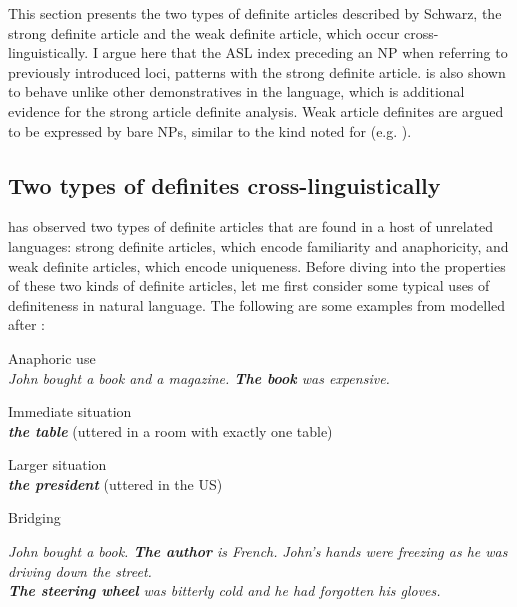 \documentclass[output=paper,
modfonts
]{langscibook}
\begin{document}
This section presents the two types of definite articles described by Schwarz, the strong definite article and the weak definite article, which occur cross\hyp{}linguistically. I argue here that the ASL index preceding an NP when referring to previously introduced loci, patterns with the strong definite article.  is also shown to behave unlike other demonstratives in the language, which is additional evidence for the strong article definite analysis. Weak article definites are argued to be expressed by bare NPs, similar to the kind noted for  (e.g. \citealt{Jenks2015}).

\subsection{Two types of definites cross-linguistically}

\citet{Schwarz2009,Schwarz2013} has observed two types of definite articles that are found in a host of unrelated languages: strong definite articles, which encode familiarity and anaphoricity, and weak definite articles, which encode uniqueness. Before diving into the properties of these two kinds of definite articles, let me first consider some typical uses of definiteness in natural language. The following are some examples from \citet{Hawkins1978} modelled after \citet{Schwarz2009}:

\begin{exe}
\ex \label{ex:irani:7} Anaphoric use\\
\textit{John bought a book and a magazine. \textbf{The book} was expensive.} 

\ex \label{ex:irani:8} Immediate situation\\
\textit{\textbf{the table}} (uttered in a room with exactly one table)

\ex \label{ex:irani:9} Larger situation \\
\textit{\textbf{the president}} (uttered in the US) 

\ex \label{ex:irani:10} Bridging \citep{Clark1975}
\begin{xlist}
	\ex\label{ex:irani:10a} \textit{John bought a book. \textbf{The author} is French.}
	\ex\label{ex:irani:10b} \textit{John’s hands were freezing as he was driving down the street. \\ \textbf{The steering wheel} was bitterly cold and he had forgotten his gloves.}
\end{xlist}

\end{exe}
\end{document}

